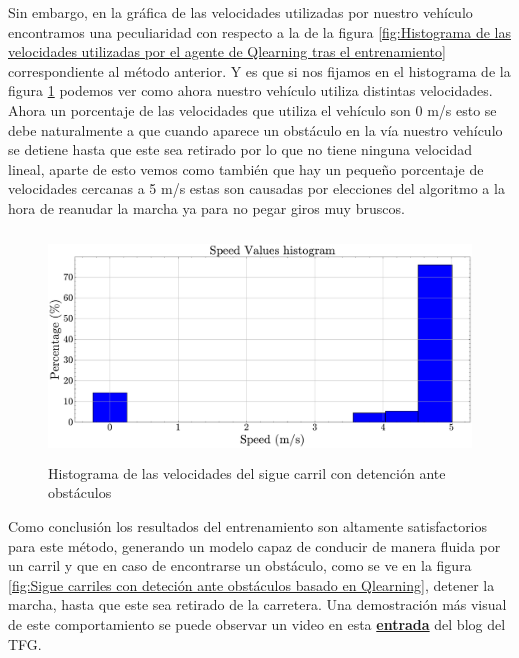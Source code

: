 \bigskip

Sin embargo, en la gráfica de las velocidades utilizadas por nuestro vehículo encontramos una peculiaridad con respecto a la de la figura \ref{fig:Histograma de las velocidades utilizadas por el agente de Qlearning tras el entrenamiento} correspondiente al método anterior. Y es que si nos fijamos en el histograma de la figura \ref{fig:Histograma de las velocidades del algoritmo sigue carril con reacción ante obstáculos} podemos ver como ahora nuestro vehículo utiliza distintas velocidades. Ahora un porcentaje de las velocidades que utiliza el vehículo son 0 m/s esto se debe naturalmente a que cuando aparece un obstáculo en la vía nuestro vehículo se detiene hasta que este sea retirado por lo que no tiene ninguna velocidad lineal, aparte de esto vemos como también que hay un pequeño porcentaje de velocidades cercanas a 5 m/s estas son causadas por elecciones del algoritmo a la hora de reanudar la marcha ya para no pegar giros muy bruscos.
\bigskip

  \begin{figure}[h]
    \centering
    \includegraphics[height=6cm]{imagenes/cap4/evita_obstaculos_qlearning/speeds.pdf}
    \caption{Histograma de las velocidades del sigue carril con detención ante obstáculos}
    \label{fig:Histograma de las velocidades del algoritmo sigue carril con reacción ante obstáculos}
\end{figure}

Como conclusión los resultados del entrenamiento son altamente satisfactorios para este método, generando un modelo capaz de conducir de manera fluida por un carril y que en caso de encontrarse un obstáculo, como se ve en la figura \ref{fig:Sigue carriles con deteción ante obstáculos basado en Qlearning}, detener la marcha, hasta que este sea retirado de la carretera. Una demostración más visual de este comportamiento se puede observar un video en esta \href{https://roboticslaburjc.github.io/2022-tfg-juancamilo-carmona/DEMOS/}{\textbf{entrada}} del blog del \ac{TFG}.
\bigskip

